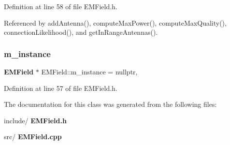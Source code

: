 Definition at line 58 of file E\+M\+Field.\+h.



Referenced by add\+Antenna(), compute\+Max\+Power(), compute\+Max\+Quality(), connection\+Likelihood(), and get\+In\+Range\+Antennas().

\mbox{\label{class_e_m_field_a7aa23feedf709c3d8a0bfc3702a8d5d8}} 
\subsubsection{m\+\_\+instance}
{\footnotesize\ttfamily \textbf{ E\+M\+Field} $\ast$ E\+M\+Field\+::m\+\_\+instance = nullptr\hspace{0.3cm}{\ttfamily [static]}, {\ttfamily [private]}}



Definition at line 57 of file E\+M\+Field.\+h.



The documentation for this class was generated from the following files\+:\begin{DoxyCompactItemize}
\item 
include/\textbf{ E\+M\+Field.\+h}\item 
src/\textbf{ E\+M\+Field.\+cpp}\end{DoxyCompactItemize}
